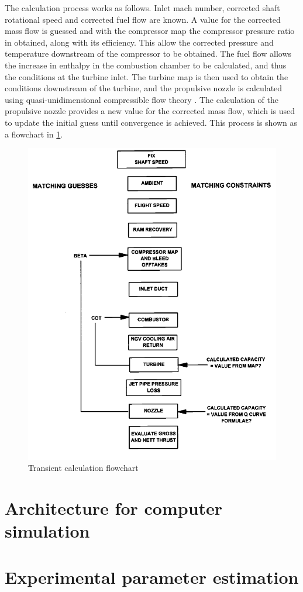 \documentclass[tcc]{subfiles}
\begin{document}
The calculation process works as follows.
Inlet mach number, corrected shaft rotational speed and corrected fuel flow are known.
A value for the corrected mass flow is guessed and with the compressor map the compressor pressure ratio in obtained, along with its efficiency.
This allow the corrected pressure and temperature downstream of the compressor to be obtained.
The fuel flow allows the increase in enthalpy in the combustion chamber to be calculated, and thus the conditions at the turbine inlet.
The turbine map is then used to obtain the conditions downstream of the turbine, and the propulsive nozzle is calculated using quasi-unidimensional compressible flow theory \cite{anderson}.
The calculation of the propulsive nozzle provides a new value for the corrected mass flow, which is used to update the initial guess until 
 convergence is achieved.
This process is shown as a flowchart in \cref{fig:transient_calculation}.

\begin{figure}
    \centering
    \caption{Transient calculation flowchart}
    \label{fig:transient_calculation}
    \includegraphics[width=\textwidth]{fig/transient_calculation_flowchart.png}
\end{figure}

\section{Architecture for computer simulation}
\section{Experimental parameter estimation}
\end{document}
